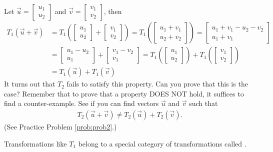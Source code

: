 \documentclass{ximera}
\begin{document}
\begin{exploration}
Let $\vec{u}=\begin{bmatrix}
u_1\\
u_2
\end{bmatrix}$ and $\vec{v}=\begin{bmatrix}
v_1\\
v_2
\end{bmatrix}$, then
\begin{align*}
T_1(\vec{u}+\vec{v})&=T_1\left(\begin{bmatrix}
u_1\\
u_2
\end{bmatrix}+\begin{bmatrix}
v_1\\
v_2
\end{bmatrix}\right)=T_1\left(\begin{bmatrix}
u_1+v_1\\
u_2+v_2
\end{bmatrix}\right)=\begin{bmatrix}
u_1+v_1-u_2-v_2\\
u_1+v_1
\end{bmatrix}\\
&=\begin{bmatrix}
u_1-u_2\\
u_1
\end{bmatrix}+\begin{bmatrix}
v_1-v_2\\
v_1
\end{bmatrix}=T_1\left(\begin{bmatrix}
u_1\\
u_2
\end{bmatrix}\right)+T_1\left(\begin{bmatrix}
v_1\\
v_2
\end{bmatrix}\right)\\
&=T_1(\vec{u})+T_1(\vec{v})
\end{align*}
It turns out that $T_2$ fails to satisfy this property.  Can you prove that this is the case?  Remember that to prove that a property DOES NOT hold, it suffices to find a counter-example.  See if you can find vectors $\vec{u}$ and $\vec{v}$ such that 
\begin{align}\label{t2}T_2(\vec{u}+\vec{v}) \neq T_2(\vec{u})+T_2(\vec{v}).\end{align}
(See Practice Problem \ref{prob:prob2}.) 
\end{exploration}
Transformations like $T_1$ belong to a special category of transformations called .
\end{document}
